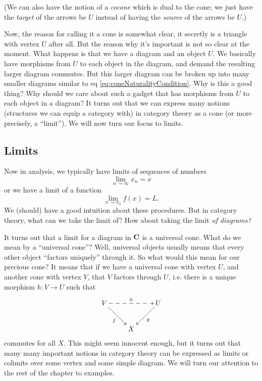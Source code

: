 (We can also have the notion of a \emph{cocone} which is dual to
the cone; we just have the \emph{target} of the arrows be $U$
instead of having the \emph{source} of the arrows be $U$.)

Now, the reason for calling it a cone is somewhat clear, it
secretly is a triangle with vertex $U$ after all. But the reason
why it's important is not so clear at the moment. What happens is
that we have a diagram and an object $U$. We basically have
morphisms from $U$ to each object in the diagram, and demand the
resulting larger diagram commutes. But this larger diagram can be
broken up into many smaller diagrams similar to eq
\eqref{eq:coneNaturalityCondition}. Why is this a good thing? Why
should we care about such a gadget that has morphisms from $U$ to
each object in a diagram? It turns out that we can express many
notions (structures we can equip a category with) in category
theory as a cone (or more precisely, a ``limit''). We will now
turn our focus to limits.

\subsection{Limits}

Now in analysis, we typically have limits of sequences of numbers
\begin{equation}%
\lim_{n\to\infty}x_{n}=x
\end{equation}
or we have a limit of a function
\begin{equation}%
\lim_{x\to{x_{0}}}f(x)=L.
\end{equation}
We (should) have a good intuition about these procedures. But in
category theory, what can we take the limit of? How about taking
the limit \emph{of diagrams?}

It turns out that a limit for a diagram in $\mathbf{C}$ is a
universal cone. What do we mean by a ``universal cone''? Well,
universal objects usually means that every other object ``factors
uniquely'' through it. So what would this mean for our precious
cone? It means that if we have a universal cone with vertex $U$,
and another cone with vertex $V$, that $V$ factors through $U$,
i.e. there is a unique morphism $h:V\to{U}$ such that
\begin{equation}%
\vcenter{\xymatrix{
V\ar[dr]_{f}\ar@{-->}[rr]^{h}&&\ar[dl]^{g}U\\
&X&
}}
\end{equation}
commutes for all $X$. This might seem innocent enough, but it
turns out that many many important notions in category theory can
be expressed as limits or colimits over some vertex and some
simple diagram. We will turn our attention to the rest of the
chapter to examples.

